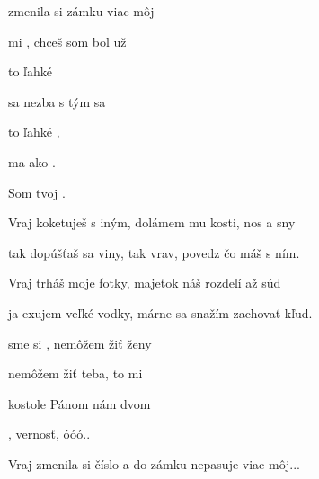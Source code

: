 


   

\zs
{} zmenila si   zámku  viac môj    {}

 mi ,  chceš  som bol už 
\ks

\zr
{} to  ľahké   

 sa nezba s tým sa 

 to  ľahké ,

 ma  ako .

Som tvoj .   
\kr

\zs
Vraj koketuješ s iným, dolámem mu kosti, nos a sny

tak dopúšťaš sa viny, tak vrav, povedz čo máš s ním.
\ks

\zr  \kr

\zs
Vraj trháš moje fotky, majetok náš rozdelí až súd

ja exujem veľké vodky, márne sa snažím zachovať kľud.
\ks

\zr  \kr

\zs
{} sme si ,  nemôžem žiť  ženy

 nemôžem žiť  teba, to mi 

 kostole  Pánom   nám dvom

 , vernosť,    óóó..
\ks

\zr     \kr

\zs
Vraj zmenila si číslo a do zámku nepasuje viac môj...
\ks

\kp





